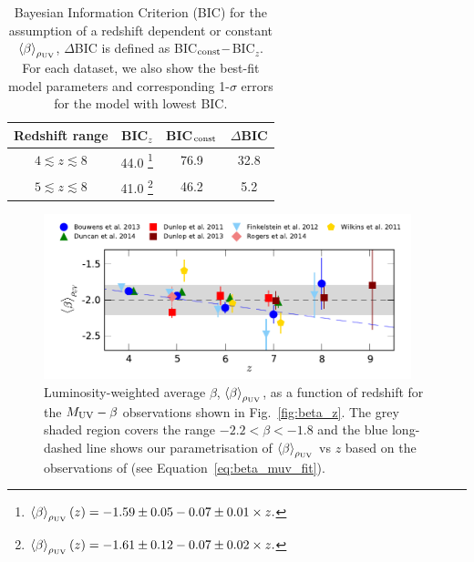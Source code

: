 \begin{table}
\begin{minipage}{\textwidth}
\centering
  \caption[Bayesian Information Criterion (BIC) for the assumption of a redshift dependent or constant $\left \langle \beta  \right \rangle_{\rho_{\rm{UV}}}$.]{Bayesian Information Criterion (BIC) for the assumption of a redshift dependent or constant $\left \langle \beta  \right \rangle_{\rho_{\rm{UV}}}$, $\Delta$BIC is defined as BIC$_{\rm{const}} -$BIC$_{z}$. For each dataset, we also show the best-fit model parameters and corresponding 1-$\sigma$ errors for the model with lowest BIC.}	
	\begin{tabular}{cccc}\label{tab:BIC_betaz}
    	Redshift range	& BIC$_{z}$ & BIC$_{\rm{const}}$ & $\Delta$BIC \\
    \hline
	$4 \lesssim z \lesssim 8$  & 44.0   \footnote[1]{\(\left \langle \beta \right \rangle_{\rho_{\rm{UV}}}(z) = -1.59 \pm 0.05 - 0.07 \pm 0.01\times z.\)} & 76.9  & 32.8 \\
	$5 \lesssim z \lesssim 8$ & 41.0   \footnote[2]{\(\left \langle \beta \right \rangle_{\rho_{\rm{UV}}}(z) = -1.61 \pm 0.12 - 0.07 \pm 0.02\times z.\)} & 46.2 & 5.2 \\
  \end{tabular}
  \end{minipage}
\end{table}

\begin{figure}
\centering
  \includegraphics[width=0.95\textwidth]{plots/Fig3.pdf}
  \caption[Luminosity-weighted average $\beta$, $\left \langle \beta  \right \rangle_{\rho_{\rm{UV}}}$, as a function of redshift for the $M_{\rm{UV}}-\beta$ observations shown in Fig.~\ref{fig:beta_z}.]{Luminosity-weighted average $\beta$, $\left \langle \beta  \right \rangle_{\rho_{\rm{UV}}}$, as a function of redshift for the $M_{\rm{UV}}-\beta$ observations shown in Fig.~\ref{fig:beta_z}. The grey shaded region covers the range $-2.2 < \beta < -1.8$ and the blue long-dashed line shows our parametrisation of $\left \langle \beta \right \rangle_{\rho_{\rm{UV}}}$ vs $z$ based on the observations of \citet{Bouwens:2013vf} (see Equation~\ref{eq:beta_muv_fit}).}
  \label{fig:beta_weightedavg}
\end{figure}

